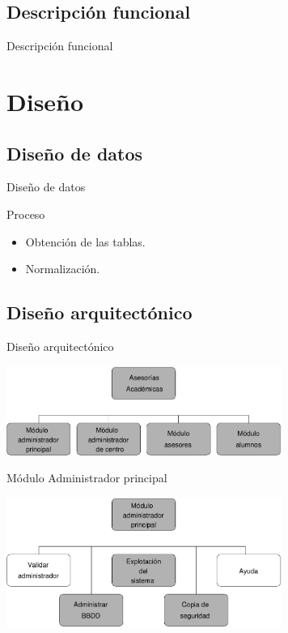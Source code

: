 \documentclass[10pt, hyperref={pdfpagelabels=false}]{beamer}
\begin{document}
    \subsection{Descripción funcional}
      \begin{frame}{Descripción funcional}

      \end{frame}


  \section{Diseño}
    \subsection{Diseño de datos}
      \begin{frame}{Diseño de datos}
        \begin{block}{Proceso}
          \begin{itemize}
            \item Obtención de las tablas.
            \item Normalización.
          \end{itemize}
        \end{block}
        
      \end{frame}

    \subsection{Diseño arquitectónico}
      \begin{frame}{Diseño arquitectónico}
        \begin{center}
          \includegraphics[width=9cm]{Diagramas/disenyoArquitectonico}
        \end{center}
      \end{frame}

      \begin{frame}{Módulo Administrador principal}
        \begin{center}
          \includegraphics[width=9cm]{Diagramas/moduloAdminPrincipal}
        \end{center}
      \end{frame}
\end{document}
